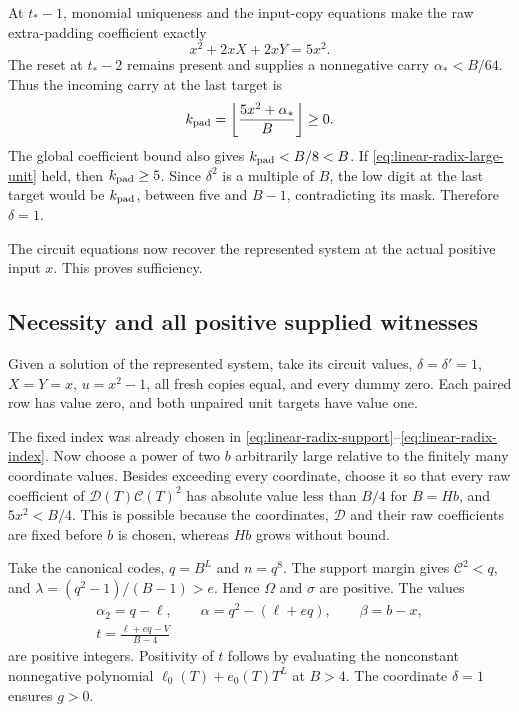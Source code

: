 At $t_*-1$, monomial uniqueness and the input-copy equations
make the raw extra-padding coefficient exactly
\[
 x^2+2xX+2xY=5x^2.
\]
The reset at $t_*-2$ remains present and supplies a nonnegative
carry $\alpha_*<B/64$. Thus the incoming carry at the last
target is
\begin{equation}\label{eq:linear-radix-unit-carry}
 k_{\rm pad}=\left\lfloor\frac{5x^2+\alpha_*}{B}\right\rfloor
 \ge0.
\end{equation}
The global coefficient bound also gives $k_{\rm pad}<B/8<B$.
If \eqref{eq:linear-radix-large-unit} held, then
$k_{\rm pad}\ge5$. Since $\delta^2$ is a multiple of $B$,
the low digit at the last target would be $k_{\rm pad}$,
between five and $B-1$, contradicting its mask. Therefore
$\delta=1$.

The circuit equations now recover the represented system at the
actual positive input $x$. This proves sufficiency.

\subsection{Necessity and all positive supplied witnesses}

Given a solution of the represented system, take its circuit
values, $\delta=\delta'=1$, $X=Y=x$, $u=x^2-1$, all fresh
copies equal, and every dummy zero. Each paired row has value
zero, and both unpaired unit targets have value one.

The fixed index was already chosen in
\eqref{eq:linear-radix-support}--\eqref{eq:linear-radix-index}.
Now choose a power of two $b$ arbitrarily large relative to the
finitely many coordinate values. Besides exceeding every
coordinate, choose it so that every raw coefficient of
$\mathcal D(T)\mathcal C(T)^2$ has absolute value less than
$B/4$ for $B=Hb$, and $5x^2<B/4$. This is possible because
the coordinates, $\mathcal D$ and their raw coefficients are
fixed before $b$ is chosen, whereas $Hb$ grows without bound.

Take the canonical codes, $q=B^L$ and $n=q^8$. The support
margin gives $\mathcal C^2<q$, and
$\lambda=(q^2-1)/(B-1)>e$. Hence $\Omega$ and $\sigma$ are
positive. The values
\[
 \begin{gathered}
 \alpha_2=q-\ell,\qquad
 \alpha=q^2-(\ell+eq),\qquad \beta=b-x,\\
 t=\frac{\ell+eq-V}{B-4}
 \end{gathered}
\]
are positive integers. Positivity of $t$ follows by evaluating
the nonconstant nonnegative polynomial
$\ell_0(T)+e_0(T)T^L$ at $B>4$. The coordinate $\delta=1$
ensures $g>0$.

